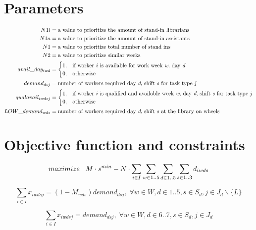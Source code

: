 \section{Parameters} \label{params}
\begin{align}
	N1l&= \text{a value to prioritize the amount of stand-in librarians}\\
	N1a&= \text{a value to prioritize the amount of stand-in assistants}\\
	N1&= \text{a value to prioritize total number of stand ins}\\
	N2&= \text{a value to prioritize similar weeks}\\
	avail\_day_{iwd}&=
	\begin{cases}
		1, & \text{if worker \textit{i} is available for work week \textit{w}, day \textit{d}} \\
		0, & \text{otherwise}
	\end{cases}\\
	demand_{dsj}&= \text{number of workers required day \textit{d}, shift \textit{s} for task type \textit{j}}\\
	qualavail_{iwdsj}&=
	\begin{cases}
		1, & \text{if worker \textit{i} is qualified and available week \textit{w}, day \textit{d}, shift \textit{s} for task type \textit{j}} \\
		0, & \text{otherwise}
	\end{cases}\\
	LOW\_demand_{wds}&= \text{number of workers required day \textit{d}, shift \textit{s} at the library on wheels}
\end{align}

\section{Objective function and constraints} \label{app:constr}
\begin{equation} \label{app:objfcn}
maximize \hspace{0.3cm} M\cdot s^{min} - N \cdot \sum_{i \in I}\sum_{w \in 1..5}\sum_{d \in 1..5}\sum_{s \in 1..3} d_{iwds}
\end{equation}

\begin{equation}
\sum_{i \in I} x_{iwdsj} = (1-M_{wds})demand_{dsj}, \; \forall w\in W,d\in 1..5,s\in S_d,j\in J_d\backslash \{L\}
\end{equation}

\begin{equation}
\sum_{i \in I} x_{iwdsj} = demand_{dsj}, \; \forall w\in W,d\in 6..7,s\in S_d,j\in J_d
\end{equation}

